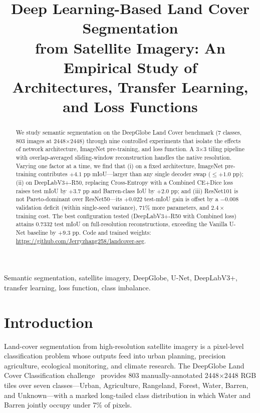 \documentclass[conference,letterpaper,10pt]{IEEEtran}
\title{Deep Learning-Based Land Cover Segmentation\\from Satellite Imagery: An Empirical Study of\\Architectures, Transfer Learning, and Loss Functions}
\author{\IEEEauthorblockN{Rongxuan Zhang}
\IEEEauthorblockA{\textit{Department of Electrical and Computer Engineering} \\
\textit{Northeastern University}\\
Boston, MA, USA \\
EECE 7370 Advanced Computer Vision \\
zhang.rongxu@northeastern.edu}}
\begin{document}
\maketitle

\begin{abstract}
We study semantic segmentation on the DeepGlobe Land Cover benchmark
(7 classes, 803 images at 2448$\times$2448) through nine controlled
experiments that isolate the effects of network architecture, ImageNet
pre-training, and loss function. A 3$\times$3 tiling pipeline with
overlap-averaged sliding-window reconstruction handles the native
resolution. Varying one factor at a time, we find that
(i) on a fixed architecture, ImageNet pre-training contributes $+4.1$
pp mIoU---larger than any single decoder swap ($\le +1.0$ pp);
(ii) on DeepLabV3+-R50, replacing Cross-Entropy with a Combined
CE$+$Dice loss raises test mIoU by $+3.7$ pp and Barren-class IoU by
$+2.0$ pp; and
(iii) ResNet101 is not Pareto-dominant over ResNet50---its $+0.022$
test-mIoU gain is offset by a $-0.008$ validation deficit (within
single-seed variance), $71\%$ more parameters, and $2.4\times$ training
cost. The best configuration tested (DeepLabV3+-R50 with Combined loss)
attains $0.7332$ test mIoU on full-resolution reconstructions, exceeding
the Vanilla U-Net baseline by $+9.3$ pp. Code and trained weights:
\url{https://github.com/Jerryzhang258/landcover-seg}.
\end{abstract}

\begin{IEEEkeywords}
Semantic segmentation, satellite imagery, DeepGlobe, U-Net, DeepLabV3+,
transfer learning, loss function, class imbalance.
\end{IEEEkeywords}

\section{Introduction}\label{sec:intro}

Land-cover segmentation from high-resolution satellite imagery is a
pixel-level classification problem whose outputs feed into urban planning,
precision agriculture, ecological monitoring, and climate research. The
DeepGlobe Land Cover Classification challenge~\cite{demir2018deepglobe}
provides 803 manually-annotated 2448$\times$2448 RGB tiles over seven
classes---Urban, Agriculture, Rangeland, Forest, Water, Barren, and
Unknown---with a marked long-tailed class distribution in which Water and
Barren jointly occupy under 7\% of pixels.
\end{document}
